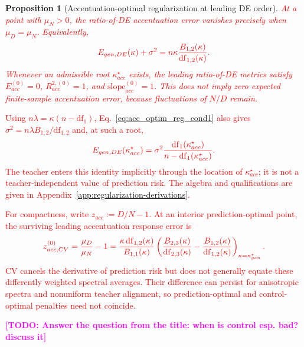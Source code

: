 \documentclass{article}
\newcommand{\red}[1]{\textcolor{red}{#1}}
\newcommand{\todo}[1]{\textcolor{magenta}{\textbf{[TODO: #1]}}}
\providecommand{\propositionname}{Proposition}
\theoremstyle{plain}
\newtheorem{prop}[thm]{\propositionname}
\theoremstyle{definition}
\theoremstyle{remark}
\begin{document}
\begin{prop}[Accentuation-optimal regularization at leading DE order]\label{prop:pixel-control-optimal}
\red{At a point with $\mu_N>0$, the ratio-of-DE accentuation error vanishes precisely when $\mu_D=\mu_N$. Equivalently,}
\begin{equation}
\color{red}
E_{gen,DE}(\kappa)+\sigma^{2}
=n\kappa\frac{B_{1,2}(\kappa)}{\mathrm{df}_{1,2}(\kappa)}.
\label{eq:acc_optim_reg_cond1}
\end{equation}
\red{Whenever an admissible root $\kappa_{acc}^{\star}$ exists, the leading ratio-of-DE metrics satisfy $E_{acc}^{(0)}=0$, $R_{acc}^{2,(0)}=1$, and $\mathrm{slope}_{acc}^{(0)}=1$. This does not imply zero expected finite-sample accentuation error, because fluctuations of $N/D$ remain.}
\end{prop}

\red{Using $n\lambda=\kappa(n-\mathrm{df}_{1})$, Eq.~\ref{eq:acc_optim_reg_cond1} also gives $\sigma^{2}=n\lambda B_{1,2}/\mathrm{df}_{1,2}$ and, at such a root,}
\begin{equation}
\color{red}
E_{gen,DE}(\kappa_{acc}^{\star})
=\sigma^{2}\frac{\mathrm{df}_{1}(\kappa_{acc}^{\star})}{n-\mathrm{df}_{1}(\kappa_{acc}^{\star})}.
\label{eq:pixel-risk-at-control-optimum}
\end{equation}
\red{The teacher enters this identity implicitly through the location of $\kappa_{acc}^{\star}$; it is not a teacher-independent value of prediction risk. The algebra and qualifications are given in Appendix~\ref{app:regularization-derivations}.}

\red{For compactness, write $z_{acc}:=D/N-1$. At an interior prediction-optimal point, the surviving leading accentuation response error is}
\begin{equation}
\color{red}
z_{acc,CV}^{(0)}
=\frac{\mu_D}{\mu_N}-1
=\frac{\kappa\,\mathrm{df}_{1,2}(\kappa)}{B_{1,1}(\kappa)}
\left(\frac{B_{2,3}(\kappa)}{\mathrm{df}_{2,3}(\kappa)}
-\frac{B_{1,2}(\kappa)}{\mathrm{df}_{1,2}(\kappa)}\right)_{\kappa=\kappa_{gen}^{\star}}.
\label{eq:pixel-zacc-cv}
\end{equation}
\red{CV cancels the derivative of prediction risk but does not generally equate these differently weighted spectral averages. Their difference can persist for anisotropic spectra and nonuniform teacher alignment, so prediction-optimal and control-optimal penalties need not coincide.}

\todo{Answer the question from the title: when is control esp. bad? discuss it}
\end{document}
